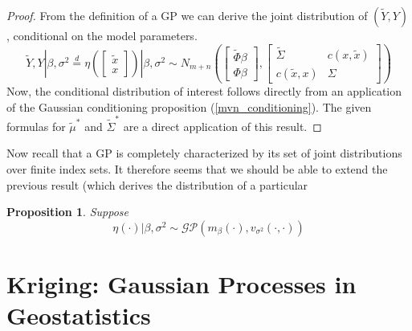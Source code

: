 \documentclass[12pt]{article}
\newtheorem{prop}{Proposition}
\begin{document}
\begin{proof}
From the definition of a GP we can derive the joint distribution of $(\tilde{Y}, Y)$, conditional on the model parameters. 
\[\tilde{Y}, Y|\beta, \sigma^2 \overset{d}{=} \eta\left(\begin{bmatrix} \tilde{x} \\ x \end{bmatrix}\right)|\beta, \sigma^2 \sim 
N_{m + n}\left(\begin{bmatrix} \tilde{\Phi}\beta \\ \Phi \beta \end{bmatrix}, \begin{bmatrix} \tilde{\Sigma} & c(x, \tilde{x}) \\ c(\tilde{x}, x) & \Sigma \end{bmatrix} \right)\]
Now, the conditional distribution of interest follows directly from an application of the Gaussian conditioning proposition (\ref{mvn_conditioning}). The given formulas
for $\tilde{\mu}^*$ and $\tilde{\Sigma}^*$ are a direct application of this result. 
\end{proof}

Now recall that a GP is completely characterized by its set of joint distributions over finite index sets. It therefore seems that we should be able to extend the previous 
result (which derives the distribution of a particular 
\begin{prop}
Suppose 
\[\eta(\cdot)|\beta, \sigma^2 \sim \mathcal{GP}(m_\beta (\cdot), v_{\sigma^2}(\cdot, \cdot)) \]
\end{prop}



\section{Kriging: Gaussian Processes in Geostatistics}
\end{document}
